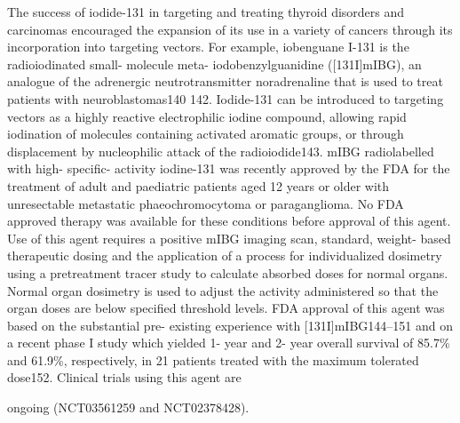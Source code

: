 \documentclass[
]{article}
\begin{document}
The success of iodide-131 in targeting and treating thyroid disorders
and carcinomas encouraged the expansion of its use in a variety of
cancers through its incorporation into targeting vectors. For example,
iobenguane I-131 is the radioiodinated small- molecule meta-
iodobenzylguanidine ({[}131I{]}mIBG), an analogue of the adrenergic
neutrotransmitter noradrenaline that is used to treat patients with
neuroblastomas140 142. Iodide-131 can be introduced to targeting vectors
as a highly reactive electrophilic iodine compound, allowing rapid
iodination of molecules containing activated aromatic groups, or through
displacement by nucleophilic attack of the radioiodide143. mIBG
radiolabelled with high- specific- activity iodine-131 was recently
approved by the FDA for the treatment of adult and paediatric patients
aged 12 years or older with unresectable metastatic phaeochromocytoma or
paraganglioma. No FDA approved therapy was available for these
conditions before approval of this agent. Use of this agent requires a
positive mIBG imaging scan, standard, weight- based therapeutic dosing
and the application of a process for individualized dosimetry using a
pretreatment tracer study to calculate absorbed doses for normal organs.
Normal organ dosimetry is used to adjust the activity administered so
that the organ doses are below specified threshold levels. FDA approval
of this agent was based on the substantial pre- existing experience with
{[}131I{]}mIBG144--151 and on a recent phase I study which yielded 1-
year and 2- year overall survival of 85.7\% and 61.9\%, respectively, in
21 patients treated with the maximum tolerated dose152. Clinical trials
using this agent are

ongoing (NCT03561259 and NCT02378428).
\end{document}
